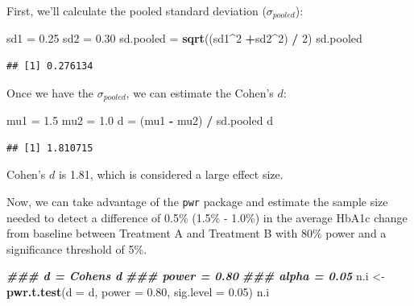 \documentclass[
]{book}
\newenvironment{Shaded}{\begin{snugshade}}{\end{snugshade}}
\newcommand{\AttributeTok}[1]{\textcolor[rgb]{0.13,0.29,0.53}{#1}}
\newcommand{\DecValTok}[1]{\textcolor[rgb]{0.00,0.00,0.81}{#1}}
\newcommand{\DocumentationTok}[1]{\textcolor[rgb]{0.56,0.35,0.01}{\textbf{\textit{#1}}}}
\newcommand{\FloatTok}[1]{\textcolor[rgb]{0.00,0.00,0.81}{#1}}
\newcommand{\FunctionTok}[1]{\textcolor[rgb]{0.13,0.29,0.53}{\textbf{#1}}}
\newcommand{\NormalTok}[1]{#1}
\newcommand{\OtherTok}[1]{\textcolor[rgb]{0.56,0.35,0.01}{#1}}
\newcommand{\SpecialCharTok}[1]{\textcolor[rgb]{0.81,0.36,0.00}{\textbf{#1}}}
\begin{document}
First, we'll calculate the pooled standard deviation (\(\sigma_{pooled}\)):

\begin{Shaded}
\begin{Highlighting}[]
\NormalTok{sd1 }\OtherTok{=} \FloatTok{0.25}
\NormalTok{sd2 }\OtherTok{=} \FloatTok{0.30}
\NormalTok{sd.pooled }\OtherTok{=} \FunctionTok{sqrt}\NormalTok{((sd1}\SpecialCharTok{\^{}}\DecValTok{2} \SpecialCharTok{+}\NormalTok{sd2}\SpecialCharTok{\^{}}\DecValTok{2}\NormalTok{) }\SpecialCharTok{/} \DecValTok{2}\NormalTok{)}
\NormalTok{sd.pooled}
\end{Highlighting}
\end{Shaded}

\begin{verbatim}
## [1] 0.276134
\end{verbatim}

Once we have the \(\sigma_{pooled}\), we can estimate the Cohen's \(d\):

\begin{Shaded}
\begin{Highlighting}[]
\NormalTok{mu1 }\OtherTok{=} \FloatTok{1.5}
\NormalTok{mu2 }\OtherTok{=} \FloatTok{1.0}
\NormalTok{d }\OtherTok{=}\NormalTok{ (mu1 }\SpecialCharTok{{-}}\NormalTok{ mu2) }\SpecialCharTok{/}\NormalTok{ sd.pooled}
\NormalTok{d}
\end{Highlighting}
\end{Shaded}

\begin{verbatim}
## [1] 1.810715
\end{verbatim}

Cohen's \(d\) is 1.81, which is considered a large effect size.

Now, we can take advantage of the \texttt{pwr} package and estimate the sample size needed to detect a difference of 0.5\% (1.5\% - 1.0\%) in the average HbA1c change from baseline between Treatment A and Treatment B with 80\% power and a significance threshold of 5\%.

\begin{Shaded}
\begin{Highlighting}[]
\DocumentationTok{\#\#\# d = Cohen\textquotesingle{}s d}
\DocumentationTok{\#\#\# power = 0.80}
\DocumentationTok{\#\#\# alpha = 0.05}
\NormalTok{n.i }\OtherTok{\textless{}{-}} \FunctionTok{pwr.t.test}\NormalTok{(}\AttributeTok{d =}\NormalTok{ d, }\AttributeTok{power =} \FloatTok{0.80}\NormalTok{, }\AttributeTok{sig.level =} \FloatTok{0.05}\NormalTok{)}
\NormalTok{n.i}
\end{Highlighting}
\end{Shaded}
\end{document}
